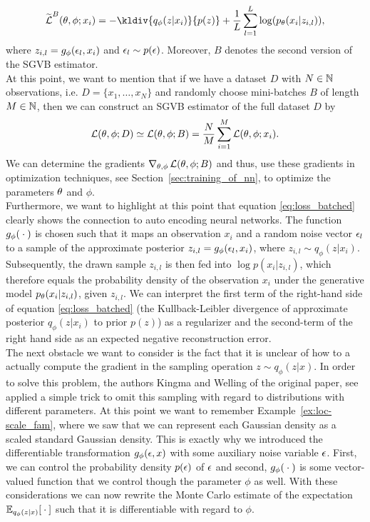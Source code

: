 \begin{align}\label{eq:loss_batched}
\tilde{\loss}^{B}(\t, \phi; x_i) = - \kldiv{q_{\phi}(z|x_i)}{p(z)} + \frac{1}{L} \sum_{l=1}^L \log(p_{\t}(x_i|z_{i,l})),
\end{align}
where $z_{i,l} = g_{\phi} (\operatorname{\epsilon}_l, x_i)$ and $\operatorname{\epsilon}_l\sim p(\operatorname{\epsilon})$. Moreover, $B$ denotes the second version of the SGVB estimator.\\
At this point, we want to mention that if we have a dataset $D$ with $N\in\operatorname{\mathbb{N}}$ observations, i.e. $D=\{x_1,\ldots, x_N\}$ and randomly choose mini-batches $B$ of length $M\in\operatorname{\mathbb{N}}$, then we can construct an SGVB estimator of the full dataset $D$ by
\begin{align*}
\operatorname{\mathcal{L}}(\theta, \phi; D) \simeq \operatorname{\mathcal{L}}(\theta, \phi; B) = \frac{N}{M} \sum_{i=1}^M\operatorname{\mathcal{L}}(\theta, \phi; x_i).
\end{align*}
We can determine the gradients $\nabla_{\theta,\phi}\operatorname{\mathcal{L}}(\theta, \phi; B)$ and thus, use these gradients in optimization techniques, see Section~\ref{sec:training_of_nn}, to optimize the parameters $\theta$ and $\phi$.\\
Furthermore, we want to highlight at this point that equation \eqref{eq:loss_batched} clearly shows the connection to auto encoding neural networks. The function $g_{\phi}({}\cdot{})$ is chosen such that it maps an observation $x_i$ and a random noise vector $\operatorname{\epsilon}_l$ to a sample of the approximate posterior $z_{i,l} = g_{\phi}(\operatorname{\epsilon}_l, x_i)$, where $z_{i,l}\sim q_{\phi}(z|x_i)$. Subsequently, the drawn sample $z_{i,l}$ is then fed into $\log p(x_i|z_{i,l})$, which therefore equals the probability density of the observation $x_i$ under the generative model $p_{\theta}(x_i|z_{i,l})$, given $z_{i,l}$. We can interpret the first term of the right-hand side of equation \eqref{eq:loss_batched} (the Kullback-Leibler divergence of approximate posterior $q_{\phi}(z|x_i)$ to prior $p(z)$) as a regularizer and the second-term of the right hand side as an expected negative reconstruction error.\\
The next obstacle we want to consider is the fact that it is unclear of how to a actually compute the gradient in the sampling operation $z\sim q_{\phi}(z|x)$. In order to solve this problem, the authors Kingma and Welling of the original paper, see \cite{kingma2013auto} applied a simple trick to omit this sampling with regard to distributions with different parameters. At this point we want to remember Example~\ref{ex:loc-scale_fam}, where we saw that we can represent each Gaussian density as a scaled standard Gaussian density. This is exactly why we introduced the differentiable transformation $g_{\phi}(\operatorname{\epsilon}, x)$ with some auxiliary noise variable $\operatorname{\epsilon}$. First, we can control the probability density $p(\operatorname{\epsilon})$ of $\operatorname{\epsilon}$ and second, $g_\phi({}\cdot{})$ is some vector-valued function that we control though the parameter $\phi$ as well. With these considerations we can now rewrite the Monte Carlo estimate of the expectation $\operatorname{\mathbb{E}}_{q_{\phi}(z|x)}[{}\cdot{}]$ such that it is differentiable with regard to $\phi$.
